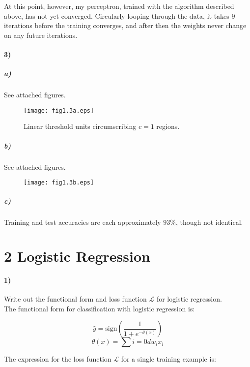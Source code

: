 \documentclass[10pt,letter]{article}
\begin{document}
At this point, however, my perceptron, trained with the algorithm described above, has not yet 
converged.  Circularly looping through the data, it takes $9$ iterations before the training 
converges, and after then the weights never change on any future iterations.

\paragraph{3)}

\subparagraph{a)} See attached figures.
\begin{figure}[b]
\vspace*{-1cm}
\centering
\texttt{[image: fig1.3a.eps]}
\caption{Linear threshold units circumscribing $c=1$ regions.}
\end{figure}

\subparagraph{b)} See attached figures.
\begin{figure}[b]
\vspace*{-2cm}
\centering
\texttt{[image: fig1.3b.eps]}
\end{figure}

\subparagraph{c)} Training and test accuracies are each approximately $93\%$, though not identical.

\section*{2 Logistic Regression}

\paragraph{1)} Write out the functional form and loss function $\mathcal{L}$ for logistic regression.\\

The functional form for classification with logistic regression is:

\[ \hat{y} = \text{sign}(\frac{1}{1 + e^{-\theta(x)}}) \]
\[ \theta(x) = \sum{i=0}{d}{w_ix_i} \]

The expression for the loss function $\mathcal{L}$ for a single training example is:
\end{document}
